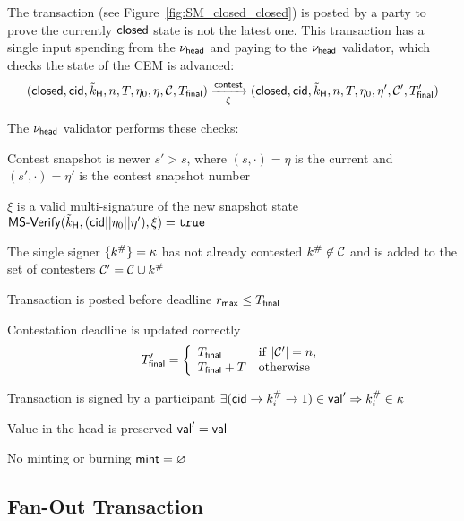 The \mtxContest{} transaction (see Figure~\ref{fig:SM_closed_closed}) is posted
by a party to prove the currently $\mathsf{closed}$ state is not the latest one. This
transaction has a single input spending from the $\nu_\mathsf{head}$ and paying to the
$\nu_\mathsf{head}$ validator, which checks the state of the CEM is advanced:
\[
  (\mathsf{closed},\mathsf{cid},\tilde{k}_{\mathsf{H}},n,T,\eta_0,\eta,\mathcal{C},T_{\mathsf{final}}) \xrightarrow[\xi]{\mathsf{contest}} (\mathsf{closed},\mathsf{cid},\tilde{k}_{\mathsf{H}},n,T,\eta_0,\eta',\mathcal{C}',T_{\mathsf{final}}')
\]

\noindent The $\nu_\mathsf{head}$ validator performs these checks:
\begin{menumerate}
  \item Contest snapshot is newer $s' > s$, where $(s, \cdot) = \eta$ is the current and $(s', \cdot) = \eta'$ is the contest snapshot number
  \item $\xi$ is a valid multi-signature of the new snapshot state
  $\mathsf{MS\textsf{-}{}Verify}(\tilde{k}_{\mathsf{H}},(\mathsf{cid} || \eta_{0} || \eta'),\xi) = \mathtt{true}$
  \item The single signer $\{k^{\#}\} = \kappa$ has not already contested $k^{\#} \not\in \mathcal{C}$ and is added to the set of contesters $\mathcal{C}' = \mathcal{C} \cup k^{\#}$
  \item Transaction is posted before deadline $r_{\mathsf{max}} \leq T_{\mathsf{final}}$
  \item Contestation deadline is updated correctly
     \[
       T_{\mathsf{final}}' = \left\{\begin{array}{ll}
                           T_{\mathsf{final}}     & \mathrm{if} ~ |\mathcal{C}'| = n, \\
                           T_{\mathsf{final}} + T & \mathrm{otherwise}
                         \end{array}\right.
    \]
  \item Transaction is signed by a participant $\exists (\mathsf{cid} \rightarrow k^{\#}_{i} \rightarrow 1) \in \mathsf{val}' \Rightarrow k^{\#}_{i} \in \kappa$
  \item Value in the head is preserved $\mathsf{val}' = \mathsf{val}$
  \item No minting or burning $\mathsf{mint} = \varnothing$
\end{menumerate}

\subsection{Fan-Out Transaction}



